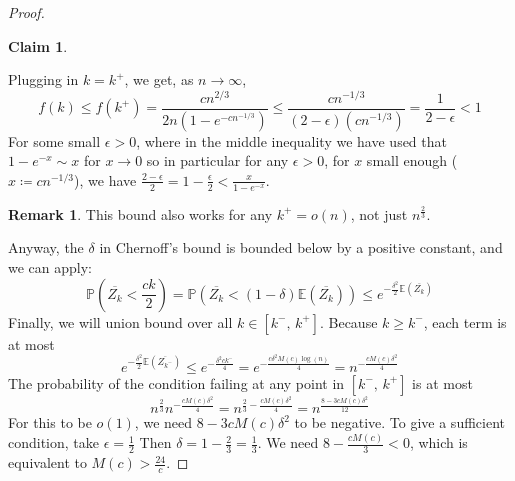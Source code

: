 \documentclass{amsart}
\theoremstyle{plain}
\newtheorem*{claim}{\textbf{Claim}}
\theoremstyle{definition}
\newtheorem*{rk}{\textbf{Remark}}
\begin{document}
\begin{proof}
\begin{claim}
    \end{claim}
    \noindent Plugging in $k = k^{+}$, we get, as $n \to \infty$,
    \begin{equation}
        f(k) \leq
        f(k^{+}) =
        \frac{cn^{2/3}}{2n\left(1 - e^{-cn^{-1/3}}\right)} \leq
        \frac{cn^{-1/3}}{(2-\epsilon)\left(cn^{-1/3}\right)} = \frac{1}{2-\epsilon} < 1
        \label{eq:fbound_2}
    \end{equation}
    For some small $\epsilon > 0$, where in the middle inequality we have used that $1 - e^{-x} \sim x$ for $ x \to 0$
    so in particular for any $\epsilon > 0$, for $x$ small enough ($x \coloneqq cn^{-1/3}$), we have
    $\frac{2-\epsilon}{2} = 1 - \frac{\epsilon}{2} < \frac{x}{1-e^{-x}}$.

    \begin{rk}
        This bound also works for any $k^+ = o(n)$, not just $n^{\frac{2}{3}}$.
    \end{rk}

    \noindent Anyway, the $\delta$ in Chernoff's bound is bounded below by a positive constant, and we can apply:
    \begin{equation}
        \mathbb{P}\left(\overline{Z_k} < \frac{ck}{2}\right) =
        \mathbb{P}\left(\overline{Z_k} < (1 - \delta)\mathbb{E}(\overline{Z_k})\right) \leq
        e^{-\frac{\delta^2}{2}\mathbb{E}(\overline{Z_k})}
        \label{eq:chernoff}
    \end{equation}
    \noindent Finally, we will union bound over all $k \in [k^{-}, \, k^{+}]$.
    Because $k \geq k^-$, each term is at most
    \begin{equation}
        e^{-\frac{\delta^2}{2}\mathbb{E}(\overline{Z_{k^-}})} \leq
        e^{-\frac{\delta^{2}ck^-}{4}} =
        e^{-\frac{c\delta^{2}M(c)\log(n)}{4}} =
        n^{-\frac{cM(c)\delta^2}{4}}
        \label{eq:logbound}
    \end{equation}
    The probability of the condition failing at any point in $[k^{-}, \, k^{+}]$ is at most
    \begin{equation}
        n^{\frac{2}{3}}n^{-\frac{cM(c)\delta^2}{4}} = n^{\frac{2}{3} - \frac{cM(c)\delta^2}{4}} =
        n^{\frac{8 - 3cM(c)\delta^2}{12}}
        \label{eq:finalbound}
    \end{equation}
    \noindent For this to be $o(1)$, we need $8 - 3cM(c)\delta^2$ to be negative.
    To give a sufficient condition, take $\epsilon = \frac{1}{2}$ Then $\delta =  1 - \frac{2}{3} = \frac{1}{3}$.
    We need $8 - \frac{cM(c)}{3} < 0$, which is equivalent to $M(c) > \frac{24}{c}$.
    \end{proof}
\end{document}
